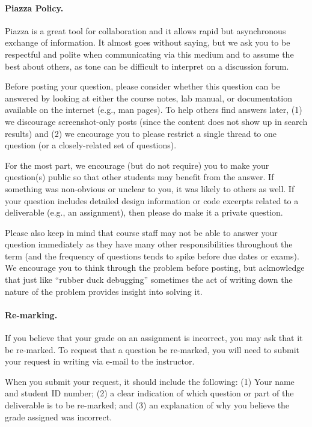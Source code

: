 \documentclass[letterpaper,10pt]{article}
\begin{document}
\paragraph{Piazza Policy.}
Piazza is a great tool for collaboration and it allows rapid but asynchronous exchange of information. It almost goes without saying, but we ask you to be respectful and polite when communicating via this medium and to assume the best about others, as tone can be difficult to interpret on a discussion forum. 

Before posting your question, please consider whether this question can be answered by looking at either the course notes, lab manual, or documentation available on the internet (e.g., man pages). To help others find answers later, (1) we discourage screenshot-only posts (since the content does not show up in search results) and (2) we encourage you to please restrict a single thread to one question (or a closely-related set of questions).

For the most part, we encourage (but do not require) you to make your question(s) public so that other students may benefit from the answer. If something was non-obvious or unclear to you, it was likely to others as well. If your question includes detailed design information or code excerpts related to a deliverable (e.g., an assignment), then please do make it a private question.

Please also keep in mind that course staff may not be able to answer your question immediately as they have many other responsibilities throughout the term (and the frequency of questions tends to spike before due dates or exams). We encourage you to think through the problem before posting, but acknowledge that just like ``rubber duck debugging'' sometimes the act of writing down the nature of the problem provides insight into solving it.

\paragraph{Re-marking.}
If you believe that your grade on an assignment is incorrect, you may ask that it be re-marked. To request that a question be re-marked, you will need to submit your request in writing via e-mail to the instructor.

When you submit your request, it should include the following: (1) Your name and student ID number; (2) a clear indication of which question or part of the deliverable is to be re-marked; and (3) an explanation of why you believe the grade assigned was incorrect.
\end{document}
